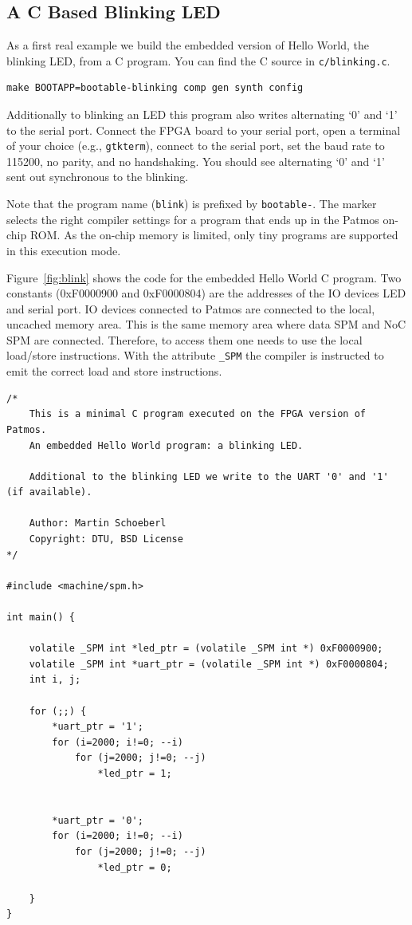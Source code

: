 \documentclass[a4paper,fontsize=10pt,twoside,DIV15,BCOR12mm,headinclude=true,footinclude=false,pagesize,bibtotoc]{scrbook}
\newcommand{\code}[1]{{\texttt{#1}}}
\begin{document}
\subsection{A C Based Blinking LED}

As a first real example we build the embedded version of Hello World, the
blinking LED, from a C program. You can find the C source in \code{c/blinking.c}.

\begin{verbatim}
make BOOTAPP=bootable-blinking comp gen synth config
\end{verbatim}

Additionally to blinking an LED this program also writes alternating `0' and `1'
to the serial port. Connect the FPGA board to your serial port,
open a terminal of your choice (e.g., \code{gtkterm}), connect to the serial port,
set the baud rate to 115200, no parity, and no handshaking.
You should see alternating `0' and `1' sent out synchronous to the blinking.

Note that the program name (\code{blink}) is prefixed by \code{bootable-}.
The marker selects the right compiler settings for a program that ends up in
the Patmos on-chip ROM. As the on-chip memory is limited, only tiny programs
are supported in this execution mode.

Figure~\ref{fig:blink} shows the code for the embedded Hello World
C program. Two constants (0xF0000900 and 0xF0000804) are the addresses
of the IO devices LED and serial port. IO devices connected to Patmos are
connected to the local, uncached memory area. This is the same memory
area where data SPM and NoC SPM are connected. Therefore, to access them
one needs to use the local load/store instructions. With the attribute \code{\_SPM}
the compiler is instructed to emit the correct load and store instructions.

\begin{lstlisting}[float,caption={A blinking LED\label{fig:blink}}]
/*
    This is a minimal C program executed on the FPGA version of Patmos.
    An embedded Hello World program: a blinking LED.

    Additional to the blinking LED we write to the UART '0' and '1' (if available).

    Author: Martin Schoeberl
    Copyright: DTU, BSD License
*/

#include <machine/spm.h>

int main() {

    volatile _SPM int *led_ptr = (volatile _SPM int *) 0xF0000900;
    volatile _SPM int *uart_ptr = (volatile _SPM int *) 0xF0000804;
    int i, j;

    for (;;) {
        *uart_ptr = '1';
        for (i=2000; i!=0; --i)
            for (j=2000; j!=0; --j)
                *led_ptr = 1;


        *uart_ptr = '0';
        for (i=2000; i!=0; --i)
            for (j=2000; j!=0; --j)
                *led_ptr = 0;

    }
}
\end{lstlisting}
\end{document}
